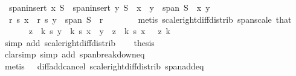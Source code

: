 \begin{isabellebody}
\ {\isacharasterisk}{\kern0pt}{\isacharcolon}{\kern0pt}\ {\isachardoublequoteopen}span{\isacharparenleft}{\kern0pt}insert\ x\ S{\isacharparenright}{\kern0pt}\ {\isasymsubseteq}\ span{\isacharparenleft}{\kern0pt}insert\ y\ S{\isacharparenright}{\kern0pt}{\isachardoublequoteclose}\ \ {\isachardoublequoteopen}{\isacharparenleft}{\kern0pt}x\ {\isacharminus}{\kern0pt}\ y{\isacharparenright}{\kern0pt}\ {\isasymin}\ span\ S{\isachardoublequoteclose}\ \ x\ y\isanewline
\ \ \isamarkupfalse%
\ {\isacharminus}{\kern0pt}\isanewline
\ \ \ \ \isamarkupfalse%
\ {}{\isacharcolon}{\kern0pt}\ {\isachardoublequoteopen}{\isacharparenleft}{\kern0pt}r\ {\isacharasterisk}{\kern0pt}s\ x\ {\isacharminus}{\kern0pt}\ r\ {\isacharasterisk}{\kern0pt}s\ y{\isacharparenright}{\kern0pt}\ {\isasymin}\ span\ S{\isachardoublequoteclose}\ \ r\isanewline
\ \ \ \ \ \ \isamarkupfalse%
\ {\isacharparenleft}{\kern0pt}metis\ scale{\isacharunderscore}{\kern0pt}right{\isacharunderscore}{\kern0pt}diff{\isacharunderscore}{\kern0pt}distrib\ span{\isacharunderscore}{\kern0pt}scale\ that{\isacharparenright}{\kern0pt}\isanewline
\ \ \ \ \isamarkupfalse%
\ {}{\isacharcolon}{\kern0pt}\ {\isachardoublequoteopen}{\isacharparenleft}{\kern0pt}z\ {\isacharminus}{\kern0pt}\ k\ {\isacharasterisk}{\kern0pt}s\ y{\isacharparenright}{\kern0pt}\ {\isacharminus}{\kern0pt}\ k\ {\isacharasterisk}{\kern0pt}s\ {\isacharparenleft}{\kern0pt}x\ {\isacharminus}{\kern0pt}\ y{\isacharparenright}{\kern0pt}\ {\isacharequal}{\kern0pt}\ z\ {\isacharminus}{\kern0pt}\ k\ {\isacharasterisk}{\kern0pt}s\ x{\isachardoublequoteclose}\ \ \ z\ k\isanewline
\ \ \ \ \ \ \isamarkupfalse%
\ {\isacharparenleft}{\kern0pt}simp\ add{\isacharcolon}{\kern0pt}\ scale{\isacharunderscore}{\kern0pt}right{\isacharunderscore}{\kern0pt}diff{\isacharunderscore}{\kern0pt}distrib{\isacharparenright}{\kern0pt}\isanewline
\ \ \isamarkupfalse%
\ {\isacharquery}{\kern0pt}thesis\isanewline
\ \ \ \ \isamarkupfalse%
\ {\isacharparenleft}{\kern0pt}clarsimp\ simp\ add{\isacharcolon}{\kern0pt}\ span{\isacharunderscore}{\kern0pt}breakdown{\isacharunderscore}{\kern0pt}eq{\isacharparenright}{\kern0pt}\isanewline
\ \ \ \ \isamarkupfalse%
\ {\isacharparenleft}{\kern0pt}metis\ {}\ {}\ diff{\isacharunderscore}{\kern0pt}add{\isacharunderscore}{\kern0pt}cancel\ scale{\isacharunderscore}{\kern0pt}right{\isacharunderscore}{\kern0pt}diff{\isacharunderscore}{\kern0pt}distrib\ span{\isacharunderscore}{\kern0pt}add{\isacharunderscore}{\kern0pt}eq{\isacharparenright}{\kern0pt}\isanewline

\end{isabellebody}
